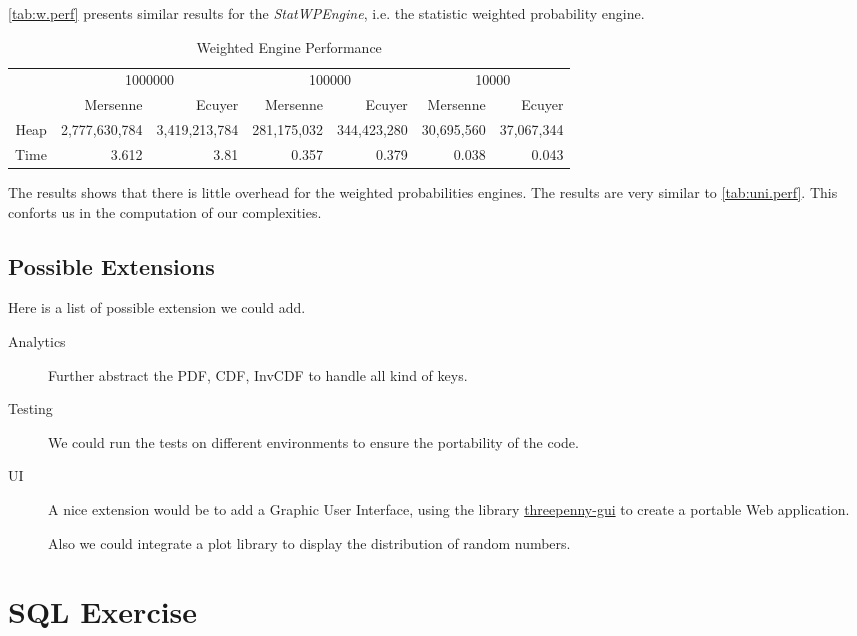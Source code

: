\documentclass[12pt,a4paper,article]{memoir} %
\begin{document}
\autoref{tab:w.perf} presents similar results for the \emph{StatWPEngine}, 
i.e. the statistic weighted probability engine.
\begin{table}[htbp!]
  \centering \tiny
    \begin{tabular}{r|rrrrrr}
    \multicolumn{1}{r}{} & \multicolumn{2}{c}{1000000} & \multicolumn{2}{c}{100000} & \multicolumn{2}{c}{10000} \\
    \multicolumn{1}{r}{} & Mersenne & Ecuyer & Mersenne & Ecuyer & Mersenne & Ecuyer \\
\cmidrule{2-7}    Heap  & 2,777,630,784 & 3,419,213,784 & 281,175,032 & 344,423,280 & 30,695,560 & 37,067,344 \\
    Time  & 3.612 & 3.81  & 0.357 & 0.379 & 0.038 & 0.043 \\
    \end{tabular}%
  \caption{Weighted Engine Performance}
  \label{tab:w.perf}%
\end{table}%
The results shows that there is little overhead for the weighted probabilities
engines. The results are very similar to \autoref{tab:uni.perf}.
This conforts us in the computation of our complexities.

\section{Possible Extensions}
Here is a list of possible extension we could add.
\begin{description}
	\item [Analytics]
	Further abstract the PDF, CDF, InvCDF to handle all kind of keys.
	\item [Testing]
	We could run the tests on different environments to ensure the portability of 
	the code.
	\item [UI] 
	A nice extension would be to add a Graphic User Interface,
	using the library 
	\href{https://hackage.haskell.org/package/threepenny-gui}{threepenny-gui}
	to create a portable Web application. 

	Also we could integrate a plot library to display the distribution of 
	random numbers.
\end{description}

\newpage
\chapter{SQL Exercise}
\end{document}
